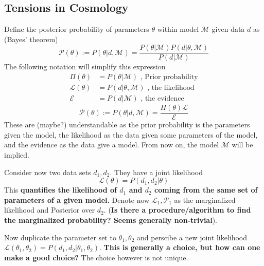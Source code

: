 \subsection{Tensions in Cosmology}
Define the posterior probability of parameters $\theta$ within model $\mathcal{M}$ given data $d$ as (Bayes' theorem)
\begin{equation}
    \mathcal{P}(\theta) := P(\theta|d,\mathcal{M}) = \frac{P(\theta|\mathcal{M})P(d|\theta,\mathcal{M})}{P(d|\mathcal{M})}
\end{equation}
The following notation will simplify this expression
\begin{equation*}
    \begin{split}
        \Pi(\theta) &= P(\theta|\mathcal{M}) \text{ , Prior probability} \\
        \mathcal{L}(\theta) &= P(d|\theta,\mathcal{M}) \text{ , the likelihood} \\
        \mathcal{E} &= P(d|\mathcal{M}) \text{ , the evidence}
    \end{split}
\end{equation*}
$$     \mathcal{P}(\theta) := P(\theta|d,\mathcal{M}) = \frac{\Pi(\theta)\mathcal{L}}{\mathcal{E}} $$
These are (maybe?) understandable as the prior probability is the parameters given the model, the likelihood as the data given some parameters of the model, and the evidence as the data give a model. From now on, the model $\mathcal{M}$ will be implied.

Consider now two data sets $d_1,d_2$. They have a joint likelihood $$\mathcal{L}(\theta) = P(d_1,d_2|\theta)$$
This \textbf{quantifies the likelihood of $d_1$ and $d_2$ coming from the same set of parameters of a given model.} Denote now $\mathcal{L}_1,\mathcal{P}_1$ as the marginalized likelihood and Posterior over $d_2$. (\textbf{Is there a procedure/algorithm to find the marginalized probability? Seems generally non-trivial}).

Now duplicate the parameter set to $\theta_1,\theta_2$ and perscibe a new joint likelihood $\mathcal{L}(\theta_1,\theta_2) = P(d_1,d_2|\theta_1,\theta_2)$.\textbf{ This is generally a choice, but how can one make a good choice?} The choice however is not unique.

